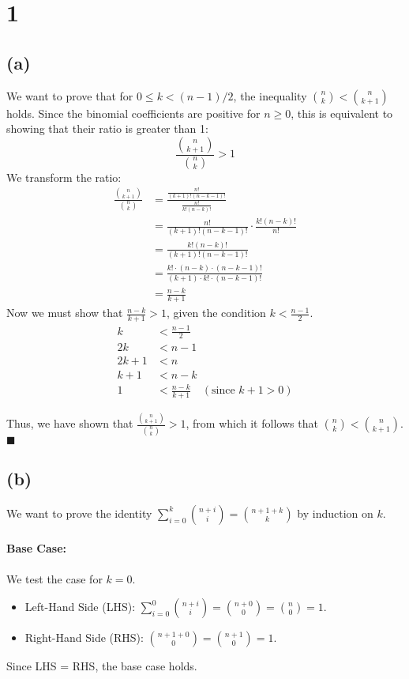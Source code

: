 \documentclass[12pt,a4paper]{article}
\theoremstyle{definition}
\theoremstyle{remark}
\begin{document}
\section*{1}
\subsection*{(a)}

We want to prove that for $0 \le k < (n-1)/2$, the inequality $\binom{n}{k} < \binom{n}{k+1}$ holds.
Since the binomial coefficients are positive for $n \ge 0$, this is equivalent to showing that their ratio is greater than 1:
\[
\frac{\binom{n}{k+1}}{\binom{n}{k}} > 1
\]
We transform the ratio:
\begin{align*}
\frac{\binom{n}{k+1}}{\binom{n}{k}} &= \frac{\frac{n!}{(k+1)!(n-k-1)!}}{\frac{n!}{k!(n-k)!}} \\
&= \frac{n!}{(k+1)!(n-k-1)!} \cdot \frac{k!(n-k)!}{n!} \\
&= \frac{k!(n-k)!}{(k+1)!(n-k-1)!} \\
&= \frac{k! \cdot (n-k) \cdot (n-k-1)!}{(k+1) \cdot k! \cdot (n-k-1)!} \\
&= \frac{n-k}{k+1}
\end{align*}
Now we must show that $\frac{n-k}{k+1} > 1$, given the condition $k < \frac{n-1}{2}$.
\begin{align*}
k &< \frac{n-1}{2} \\
2k &< n-1 \\
2k+1 &< n \\
k+1 &< n-k \\
1 &< \frac{n-k}{k+1} \quad (\text{since } k+1 > 0)
\end{align*}

Thus, we have shown that $\frac{\binom{n}{k+1}}{\binom{n}{k}} > 1$, from which it follows that $\binom{n}{k} < \binom{n}{k+1}$. $\blacksquare$

\subsection*{(b)}


We want to prove the identity $\sum_{i=0}^{k} \binom{n+i}{i} = \binom{n+1+k}{k}$ by induction on $k$.

\paragraph{Base Case:} We test the case for $k=0$.
\begin{itemize}
    \item Left-Hand Side (LHS): $\sum_{i=0}^{0} \binom{n+i}{i} = \binom{n+0}{0} = \binom{n}{0} = 1$.
    \item Right-Hand Side (RHS): $\binom{n+1+0}{0} = \binom{n+1}{0} = 1$.
\end{itemize}
Since LHS = RHS, the base case holds.
\end{document}
